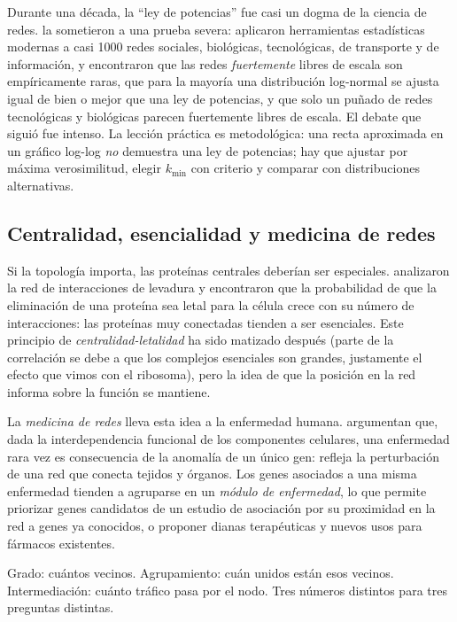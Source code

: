 \begin{historia}
Durante una década, la ``ley de potencias'' fue casi un dogma de la ciencia de redes. \textcite{c16-broido2019} la sometieron a una prueba severa: aplicaron herramientas estadísticas modernas a casi \num{1000} redes sociales, biológicas, tecnológicas, de transporte y de información, y encontraron que las redes \emph{fuertemente} libres de escala son empíricamente raras, que para la mayoría una distribución log-normal se ajusta igual de bien o mejor que una ley de potencias, y que solo un puñado de redes tecnológicas y biológicas parecen fuertemente libres de escala. El debate que siguió fue intenso. La lección práctica es metodológica: una recta aproximada en un gráfico log-log \emph{no} demuestra una ley de potencias; hay que ajustar por máxima verosimilitud, elegir $k_{\min}$ con criterio y comparar con distribuciones alternativas.
\end{historia}

\subsection{Centralidad, esencialidad y medicina de redes}

Si la topología importa, las proteínas centrales deberían ser especiales. \textcite{c16-jeong2001} analizaron la red de interacciones de levadura y encontraron que la probabilidad de que la eliminación de una proteína sea letal para la célula crece con su número de interacciones: las proteínas muy conectadas tienden a ser esenciales. Este principio de \emph{centralidad-letalidad} ha sido matizado después (parte de la correlación se debe a que los complejos esenciales son grandes, justamente el efecto que vimos con el ribosoma), pero la idea de que la posición en la red informa sobre la función se mantiene.

La \emph{medicina de redes} lleva esta idea a la enfermedad humana. \textcite{c16-barabasi2011} argumentan que, dada la interdependencia funcional de los componentes celulares, una enfermedad rara vez es consecuencia de la anomalía de un único gen: refleja la perturbación de una red que conecta tejidos y órganos. Los genes asociados a una misma enfermedad tienden a agruparse en un \emph{módulo de enfermedad}, lo que permite priorizar genes candidatos de un estudio de asociación por su proximidad en la red a genes ya conocidos, o proponer dianas terapéuticas y nuevos usos para fármacos existentes.

\begin{ideaclave}
Grado: cuántos vecinos. Agrupamiento: cuán unidos están esos vecinos. Intermediación: cuánto tráfico pasa por el nodo. Tres números distintos para tres preguntas distintas.
\end{ideaclave}

